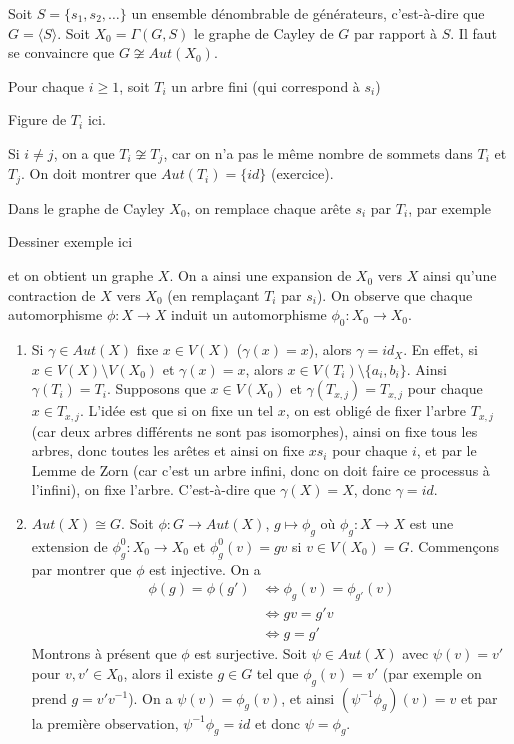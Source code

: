   \begin{preuve}
    Soit $S = \{s_1, s_2, \ldots \}$ un ensemble dénombrable de générateurs, c'est-à-dire que $G = \langle S
    \rangle$. Soit $X_0 = \Gamma(G,S)$ le graphe de Cayley de $G$ par rapport à $S$. Il faut se convaincre que
    $G \not\cong Aut(X_0)$.

    Pour chaque $i \geq 1$, soit $T_i$ un arbre fini (qui correspond à $s_i$)
    \begin{center}
      Figure de $T_i$ ici.
    \end{center}
    Si $i \neq j$, on a que $T_i \not\cong T_j$, car on n'a pas le même nombre de sommets dans $T_i$ et
    $T_j$. On doit montrer que $Aut(T_i) = \{id\}$ (exercice). 

    Dans le graphe de Cayley $X_0$, on remplace chaque arête $s_i$ par $T_i$, par exemple
    \begin{center}
      Dessiner exemple ici
    \end{center}
    et on obtient un graphe $X$. On a ainsi une expansion de $X_0$ vers $X$ ainsi qu'une contraction de $X$
    vers $X_0$ (en remplaçant $T_i$ par $s_i$). On observe que chaque automorphisme $\phi: X \to X$ induit un
    automorphisme $\phi_0: X_0 \to X_0$. 
    \begin{enumerate}
    \item Si $\gamma \in Aut(X)$ fixe $x \in V(X)$ ($\gamma(x) = x$), alors $\gamma = id_X$. En effet, si $x
      \in V(X) \setminus V(X_0)$ et $\gamma(x) = x$, alors $x \in V(T_i) \setminus \{a_i, b_i\}$. Ainsi
      $\gamma(T_i) = T_i$. Supposons que $x \in V(X_0)$ et $\gamma(T_{x,j}) = T_{x,j}$ pour chaque $x \in
      T_{x,j}$. L'idée est que si on fixe un tel $x$, on est obligé de fixer l'arbre $T_{x,j}$ (car deux
      arbres différents ne sont pas isomorphes), ainsi on fixe tous les arbres, donc toutes les arêtes et
      ainsi on fixe $xs_i$ pour chaque $i$, et par le Lemme de Zorn (car c'est un arbre infini, donc on doit
      faire ce processus à l'infini), on fixe l'arbre. C'est-à-dire que $\gamma(X) = X$, donc $\gamma = id$.

    \item $Aut(X) \cong G$. Soit $\phi: G \to Aut(X)$, $g \mapsto \phi_g$ où $\phi_g : X \to X$ est une
      extension de $\phi_g^0: X_0 \to X_0$ et $\phi_g^0(v) = gv$ si $v \in V(X_0) = G$. Commençons par montrer
      que $\phi$ est injective. On a
      \begin{align*}
        \phi(g) = \phi(g') &\iff \phi_g(v) = \phi_{g'}(v)\\
        &\iff gv = g'v\\
        &\iff g = g'
      \end{align*}
      Montrons à présent que $\phi$ est surjective. Soit $\psi \in Aut(X)$ avec $\psi(v) = v'$ pour $v,v' \in
      X_0$, alors il existe $g \in G$ tel que $\phi_g(v) = v'$ (par exemple on prend $g = v'v^{-1}$). On a
      $\psi(v) = \phi_g(v)$, et ainsi $(\psi^{-1}\phi_g)(v) = v$ et par la première observation,
      $\psi^{-1}\phi_g = id$ et donc $\psi = \phi_g$. \qedhere
    \end{enumerate}
  \end{preuve}

